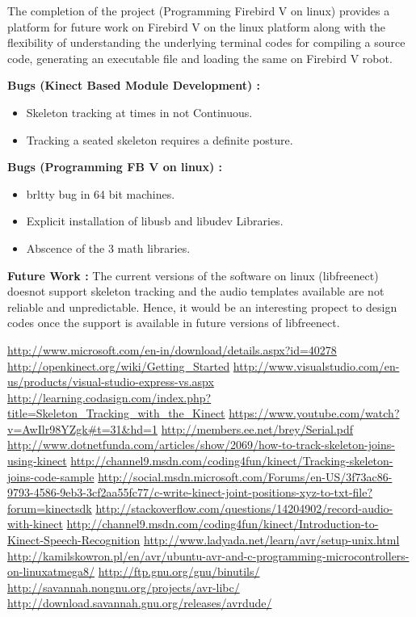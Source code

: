 \documentclass[20pt]{report}
\begin{document}
The completion of the project (Programming Firebird V on linux) provides a platform for future work on Firebird V on the linux platform along with the flexibility of understanding the underlying terminal codes for compiling a source code, generating an executable file and loading the same on Firebird V robot.
\medskip



\textbf{Bugs (Kinect Based Module Development) :}
\begin{itemize}
\item Skeleton tracking at times in not Continuous.
\item Tracking a seated skeleton requires a definite posture.
\end{itemize}

\textbf{Bugs (Programming FB V on linux) :}

\begin{itemize}
\item brltty bug in 64 bit machines.
\item Explicit installation of libusb and libudev Libraries.
\item Abscence of the 3 math libraries.
\end{itemize}

\medskip

\textbf{Future Work : }
The current versions of the software on linux (libfreenect) doesnot support skeleton tracking and the audio templates available are not reliable and unpredictable. Hence, it would be an interesting propect to design codes once the support is available in future versions of libfreenect.

\medskip

\begin{thebibliography}{99}
 \url{http://www.microsoft.com/en-in/download/details.aspx?id=40278}
 \url{http://openkinect.org/wiki/Getting\_Started}
 \url{http://www.visualstudio.com/en-us/products/visual-studio-express-vs.aspx}
 \url{http://learning.codasign.com/index.php?title=Skeleton\_Tracking\_with\_the\_Kinect}
 \url{https://www.youtube.com/watch?v=AwIlr98YZgk#t=31\&hd=1}
 \url{http://members.ee.net/brey/Serial.pdf}
 \url{http://www.dotnetfunda.com/articles/show/2069/how-to-track-skeleton-joins-using-kinect}
 \url{http://channel9.msdn.com/coding4fun/kinect/Tracking-skeleton-joins-code-sample}
 \url{http://social.msdn.microsoft.com/Forums/en-US/3f73ac86-9793-4586-9eb3-3cf2aa55fc77/c-write-kinect-joint-positions-xyz-to-txt-file?forum=kinectsdk}
 \url{http://stackoverflow.com/questions/14204902/record-audio-with-kinect}
 \url{http://channel9.msdn.com/coding4fun/kinect/Introduction-to-Kinect-Speech-Recognition}
 \url{http://www.ladyada.net/learn/avr/setup-unix.html}
 \url{http://kamilskowron.pl/en/avr/ubuntu-avr-and-c-programming-microcontrollers-on-linuxatmega8/}
\url{http://ftp.gnu.org/gnu/binutils/}
\url{http://savannah.nongnu.org/projects/avr-libc/}
\url{http://download.savannah.gnu.org/releases/avrdude/}
\end{thebibliography}
\end{document}
